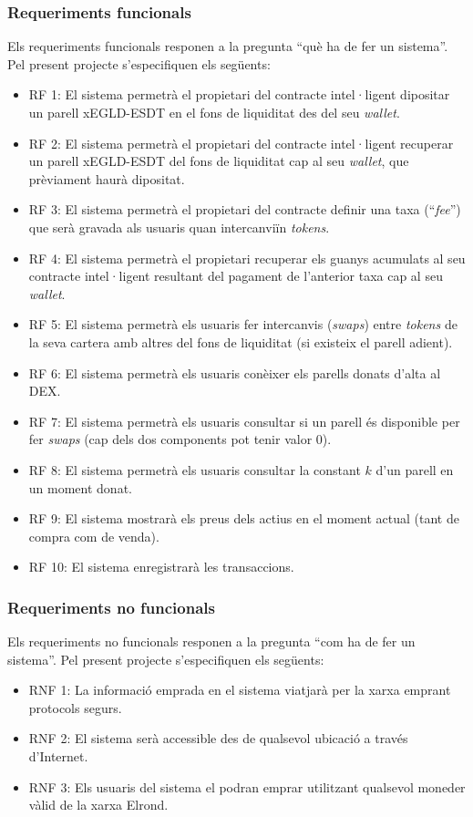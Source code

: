 \documentclass[11pt,a4paper]{article}
\begin{document}
\subsubsection{Requeriments funcionals}\label{subsub:rfun}
Els requeriments funcionals responen a la pregunta ``què ha de fer un sistema''. Pel present projecte s'especifiquen els següents:
\begin{itemize}
\item RF 1: El sistema permetrà el propietari del contracte intel·ligent dipositar un parell xEGLD-ESDT en el fons de liquiditat des del seu \textit{wallet}.
\item RF 2: El sistema permetrà el propietari del contracte intel·ligent recuperar un parell xEGLD-ESDT del fons de liquiditat cap al seu \textit{wallet}, que prèviament haurà dipositat.
\item RF 3: El sistema permetrà el propietari del contracte definir una taxa (``\textit{fee}'') que serà gravada als usuaris quan intercanviïn \textit{tokens}.
\item RF 4: El sistema permetrà el propietari recuperar els guanys acumulats al seu contracte intel·ligent resultant del pagament de l'anterior taxa cap al seu \textit{wallet}.
\item RF 5: El sistema permetrà els usuaris fer intercanvis (\textit{swaps}) entre \textit{tokens} de la seva cartera amb altres del fons de liquiditat (si existeix el parell adient).
\item RF 6: El sistema permetrà els usuaris conèixer els parells donats d'alta al DEX.
\item RF 7: El sistema permetrà els usuaris consultar si un parell és disponible per fer \textit{swaps} (cap dels dos components pot tenir valor 0).
\item RF 8: El sistema permetrà els usuaris consultar la constant \(k\) d'un parell en un moment donat.
\item RF 9: El sistema mostrarà els preus dels actius en el moment actual (tant de compra com de venda).
\item RF 10: El sistema enregistrarà les transaccions.
\end{itemize}

\subsubsection{Requeriments no funcionals}\label{subsub:rnofun}
Els requeriments no funcionals responen a la pregunta ``com ha de fer un sistema''. Pel present projecte s'especifiquen els següents:
\begin{itemize}
\item RNF 1: La informació emprada en el sistema viatjarà per la xarxa emprant protocols segurs.
\item RNF 2: El sistema serà accessible des de qualsevol ubicació a través d'Internet.
\item RNF 3: Els usuaris del sistema el podran emprar utilitzant qualsevol moneder vàlid de la xarxa Elrond.
\end{itemize}
\end{document}
